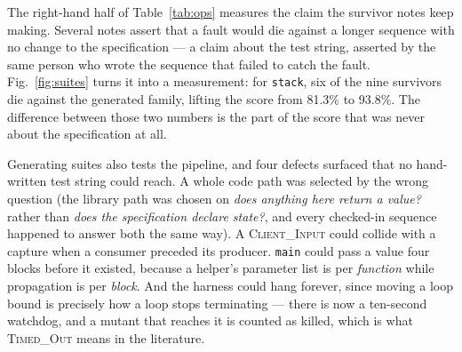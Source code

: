 \documentclass[conference]{IEEEtran}
\begin{document}
The right-hand half of Table~\ref{tab:ops} measures the claim the survivor notes keep
making. Several notes assert that a fault would die against a longer sequence with no
change to the specification --- a claim about the test string, asserted by the same
person who wrote the sequence that failed to catch the fault. Fig.~\ref{fig:suites}
turns it into a measurement: for \texttt{stack}, six of the nine survivors die against
the generated family, lifting the score from 81.3\% to 93.8\%. The difference between
those two numbers is the part of the score that was never about the specification at
all.

Generating suites also tests the pipeline, and four defects surfaced that no
hand-written test string could reach. A whole code path was selected by the wrong
question (the library path was chosen on \emph{does anything here return a value?}
rather than \emph{does the specification declare state?}, and every checked-in sequence
happened to answer both the same way). A \textsc{Client\_Input} could collide with a
capture when a consumer preceded its producer. \texttt{main} could pass a value four
blocks before it existed, because a helper's parameter list is per \emph{function}
while propagation is per \emph{block}. And the harness could hang forever, since moving
a loop bound is precisely how a loop stops terminating --- there is now a ten-second
watchdog, and a mutant that reaches it is counted as killed, which is what
\textsc{Timed\_Out} means in the literature.
\end{document}
